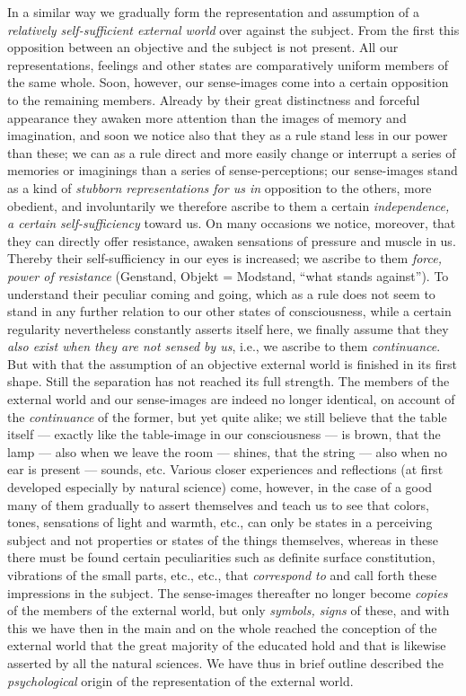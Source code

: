 \documentclass[12pt,a4paper,openany]{book}
\newcommand{\opage}[1]{\marginnote{\footnotesize\textit{[#1]}}}
\begin{document}
In a similar way we gradually form the representation and assumption of a \emph{relatively
self-sufficient external world} over against the subject. From the first this opposition
between an objective and the subject is not present. All our representations, feelings
and other states are comparatively uniform members of the same whole. Soon, however, our
sense-images come into a certain opposition to the remaining members. Already by their
great distinctness and forceful appearance they awaken more attention than the images of
memory and imagination, and soon we notice also that they as a rule stand less in our
power than these; we can as a rule direct and more easily change or interrupt a series of
memories or imaginings than a series of sense-perceptions; our sense-images stand as a kind of
\emph{stubborn representations for us in} opposition to the others, more obedient, and
involuntarily we therefore ascribe to them a certain \emph{independence, a certain}
\emph{self-sufficiency} toward us. On many occasions we notice, moreover, that they can
directly offer resistance, awaken sensations of pressure and muscle in us. Thereby their
self-sufficiency in our eyes is increased; we ascribe to them \emph{force, power of
resistance} (Genstand, Objekt =
\setcounter{footnote}{0}%
\opage{251}Modstand, ``what stands against''). To understand their peculiar coming and going,
which as a rule does not seem to stand in any further relation to our other states of
consciousness, while a certain regularity nevertheless constantly asserts itself here, we
finally assume that they \emph{also exist when they are not sensed}
\emph{by us}, i.e., we ascribe to them \emph{continuance}. But with that the assumption of
an objective external world is finished in its first shape. Still the separation has not
reached its full strength. The members of the external world and our sense-images are
indeed no longer identical, on account of the \emph{continuance} of the former, but yet
quite alike; we still believe that the table itself --- exactly like the table-image in
our consciousness --- is brown, that the lamp --- also when we leave the room --- shines,
that the string --- also when no ear is present --- sounds, etc. Various closer
experiences and reflections (at first developed especially by natural science) come,
however, in the case of a good many of them gradually to assert themselves and teach us
to see that colors, tones, sensations of light and warmth, etc., can only be states in a
perceiving subject and not properties or states of the things themselves, whereas in
these there must be found certain peculiarities such as definite surface constitution,
vibrations of the small parts, etc., etc., that \emph{correspond to} and call forth these
impressions in the subject. The sense-images thereafter no longer become \emph{copies} of
the members of the external world, but only \emph{symbols, signs} of these, and with this
we have then in the main and on the whole reached the conception of the external world
that the great majority of the educated hold and that is likewise asserted by all the
natural sciences. We have thus in brief outline described the \emph{psychological} origin
of the representation of the external world.
\end{document}
